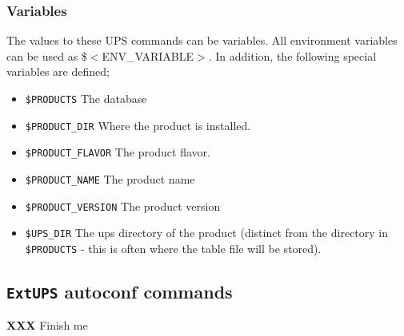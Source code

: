 \documentclass{article}
\newcommand{\XXX}[1]{\textbf{XXX} #1}
\newcommand{\code}[1]{\texttt{#1}}
\newcommand{\eups}{\code{ExtUPS}}
\begin{document}
\subsubsection{Variables}

The values to these UPS commands can be variables. All environment
variables can be used as \${$<$ENV\_VARIABLE$>$}. In addition, the following special
variables are defined;

\begin{itemize}
  \item \code{\${PRODUCTS}}
    The database
    
  \item \code{\${PRODUCT\_DIR}}
    Where the product is installed.
    
  \item \code{\${PRODUCT\_FLAVOR}}
    The product flavor.
    
  \item \code{\${PRODUCT\_NAME}}
    The product name
    
  \item \code{\${PRODUCT\_VERSION}}
    The product version
    
  \item \code{\${UPS\_DIR}}
    The ups directory of the product (distinct from the directory
    in \code{\$PRODUCTS} - this is often where the table file will be stored).
\end{itemize}

\subsection{\eups{} autoconf commands}
\label{autoconfReference}

\XXX{Finish me}
\end{document}
